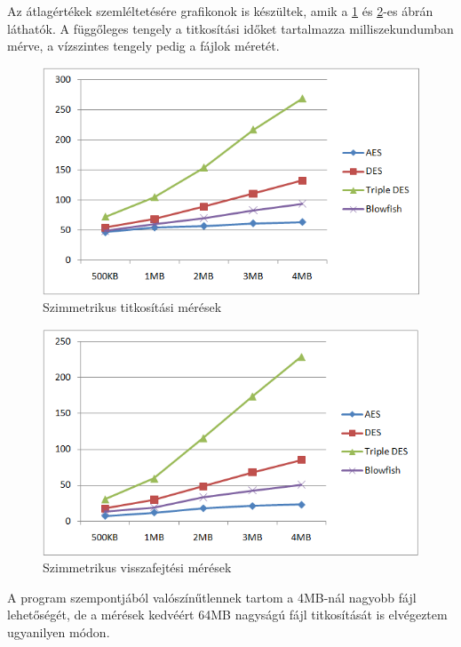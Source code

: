 Az átlagértékek szemléltetésére grafikonok is készültek, amik a \ref{fig:alg_titkositas_graf} és \ref{fig:alg_visszafejtes_graf}-es ábrán láthatók. A függőleges tengely a titkosítási időket tartalmazza milliszekundumban mérve, a vízszintes tengely pedig a fájlok méretét.
\begin{figure}[H]
	\centering
	\includegraphics[scale=0.8]{images/alg_graf_1.png}
	\caption{Szimmetrikus titkosítási mérések}
	\label{fig:alg_titkositas_graf}
\end{figure}

\begin{figure}[H]
	\centering
	\includegraphics[scale=0.8]{images/alg_graf_2.png}
	\caption{Szimmetrikus visszafejtési mérések}
	\label{fig:alg_visszafejtes_graf}
\end{figure}


A program szempontjából valószínűtlennek tartom a 4MB-nál nagyobb fájl lehetőségét, de a mérések kedvéért 64MB nagyságú fájl titkosítását is elvégeztem ugyanilyen módon. 


